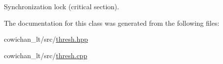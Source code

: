 Synchronization lock (critical section). 

The documentation for this class was generated from the following files:\begin{CompactItemize}
\item 
cowichan\_\-lt/src/\hyperlink{thresh_8hpp}{thresh.hpp}\item 
cowichan\_\-lt/src/\hyperlink{cowichan__lt_2src_2thresh_8cpp}{thresh.cpp}\end{CompactItemize}

